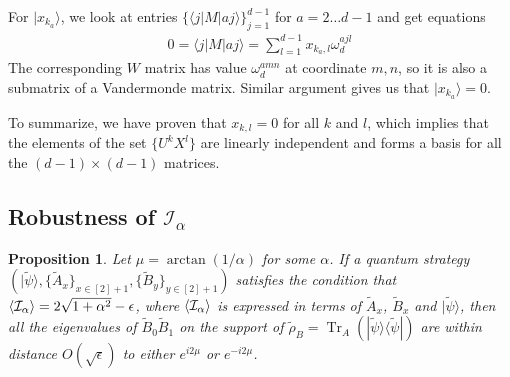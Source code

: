 \documentclass[11pt,letterpaper]{article}
\newcommand{\ket}[1]{|#1\rangle}
\newcommand{\bra}[1]{\langle#1|}
\newcommand{\ketbra}[2]{|#1\rangle\langle#2|}
\DeclarePairedDelimiter{\ip}{\langle}{\rangle}
\DeclareMathOperator{\Tr}{Tr}
\newcommand{\1}{\mathbb{1}}
\newcommand{\tA}{\tilde{A}}
\newcommand{\tB}{\tilde{B}}
\newcommand{\tpsi}{\tilde{\psi}}
\newcommand{\I}{\mathcal{I}}
\newtheorem{proposition}[theorem]{Proposition}
\theoremstyle{definition}
\begin{document}
For $\ket{x_{k_a}}$, we look at entries $\{\bra{j}M\ket{aj}\}_{j=1}^{d-1}$ for $a = 2 \dots d-1$ and get equations
\begin{align}
	0 = \bra{j}M\ket{aj} = \sum_{l=1}^{d-1} x_{k_a, l} \omega_d^{ajl} 
\end{align}
The corresponding $W$ matrix has value $\omega_d^{amn}$ at coordinate $m,n$,
so it is also a submatrix of a Vandermonde matrix. Similar argument gives us that $\ket{x_{k_a}} = 0$.

To summarize, we have proven that $x_{k,l} = 0$ for all $k$ and $l$, which implies that the elements of the set
$\{ U^k X^l \}$ are linearly independent and forms a basis for all the $(d-1)\times(d-1)$ matrices.
\subsection{Robustness of $\I_\alpha$}
\begin{proposition}
\label{prop:2d-subspace}
	Let $\mu = \arctan(1/\alpha)$ for some $\alpha$.
	If a quantum strategy $(\ket{\tpsi}, \{\tilde{A}_x\}_{x \in [2]+1}, \{\tilde{B}_y\}_{y \in [2]+1})$ 
	satisfies the condition that $\ip{\I_\alpha} = 2\sqrt{1+\alpha^2}-\epsilon$, where 
	$\ip{\I_\alpha}$ is expressed in terms of $\tA_x$,  $\tB_x$ and $\ket{\tpsi}$,
	then all the eigenvalues of $\tilde{B}_0\tilde{B}_1$ on the support of 
	$\tilde{\rho}_B = \Tr_A(\ketbra{\tpsi}{\tpsi})$
	are within distance $O(\sqrt{\epsilon})$ to either $e^{i2\mu}$ or $e^{-i2\mu}$.
\end{proposition}
\end{document}
